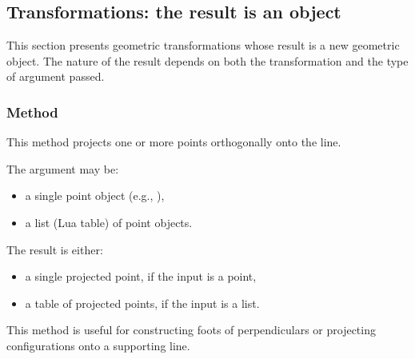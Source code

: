 \subsection{Transformations: the result is an object}
\label{sub:the_result_is_an_object}

This section presents geometric transformations whose result is a new geometric object. The nature of the result depends on both the transformation and the type of argument passed.


\subsubsection{Method }
\label{ssub:example_projection_of_several_points}

This method projects one or more points orthogonally onto the line.

\medskip
\noindent
The argument  may be:
\begin{itemize}
  \item a single point object (e.g., ),
  \item a list (Lua table) of point objects.
\end{itemize}

\noindent
The result is either:
\begin{itemize}
  \item a single projected point, if the input is a point,
  \item a table of projected points, if the input is a list.
\end{itemize}

\medskip
\noindent
This method is useful for constructing foots of perpendiculars or projecting configurations onto a supporting line.

\vspace{1em}

\begin{tkzexample}[latex=.5\textwidth]
\begin{center}
\end{center}
\end{tkzexample}

